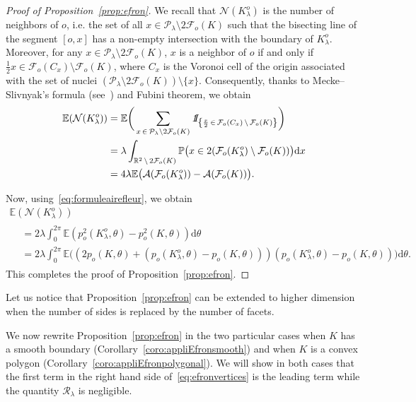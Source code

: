 \documentclass[AHL,Unicode,longabstracts,published]{cedram}
\newcommand{\indicat}{{\text{1}}\negthickspace\text{I}}
\newcommand{\cA}{\mathcal{A}}
\newcommand{\cF}{\mathcal{F}}
\newcommand{\cN}{\mathcal{N}}
\newcommand{\cP}{\mathcal{P}}
\newcommand{\cR}{\mathcal{R}}
\newcommand{\dd}{\mathrm{d}}
\newcommand{\E}{\mathbb{E}}
\renewcommand{\P}{\mathbb{P}}
\newcommand{\R}{\mathbb{R}}
\newcommand{\pass}{\vspace{0.3cm}\noindent}
\newcommand{\noi}{\noindent}
\newcommand{\R}{\mathbb{R}}
\begin{document}
\begin{proof}[{Proof of Proposition~\ref{prop:efron}}]
We recall that $\cN(K_{\lambda}^o)$ is the number of neighbors of $o$, i.e. the set of all $x\in\cP_{\lambda}\setminus 2\cF_o(K)$ such that the bisecting line of the segment $[o,x]$ has a non-empty intersection with the boundary of $K_{\lambda}^o$. Moreover, for any $x\in\cP_{\lambda}\setminus 2\cF_o(K)$, $x$ is a neighbor of $o$ if and only if $\tfrac{1}{2}x\in \cF_o(C_x)\setminus\cF_o(K)$, where $C_x$ is the Voronoi cell of the origin associated with the set of nuclei $(\cP_{\lambda}\setminus 2\cF_o(K))\setminus\{x\}$. Consequently, thanks to Mecke--Slivnyak's formula (see~\cite[Corollary~3.2.3]{SW}) and Fubini theorem, we obtain
\begin{align*}
\E(\cN(K_{\lambda}^o)) &= \E\bigg(\sum_{x\,\in\,\cP_{\lambda}\setminus2\cF_o(K)}{\emph{\indicat}}_{\left\{\frac{x}{2}\,\in\,\cF_o(C_x)\,\setminus\,\cF_o(K)\right\}}\bigg)\\
& = \lambda\int_{\R^2\,\setminus\,2\cF_o(K)}\P\big(x\in 2(\cF_o(K_{\lambda}^o)\setminus\cF_o(K))\big)\dd x \\
& = 4\lambda\E\big(\cA(\cF_o(K_{\lambda}^o))-\cA(\cF_o(K))\big).
\end{align*}

Now, using~\eqref{eq:formuleairefleur}, we obtain
\begin{multline*}\label{sophie}
\E(\cN(K_{\lambda}^o)) \\
\begin{aligned}
& = 2\lambda\int_0^{2\pi}\E\left(p_o^2\left(K_{\lambda}^o,\theta\right)-p_o^2(K,\theta)\right)\dd\theta\\
& = 2\lambda\int_0^{2\pi}\E\big((2p_o(K,\theta)+(p_o(K_{\lambda}^o,\theta)-p_o(K,\theta)))(p_o(K_{\lambda}^o,\theta)-p_o(K,\theta))\big)\dd\theta.
\end{aligned}
\end{multline*}
This completes the proof of Proposition~\ref{prop:efron}.
\end{proof}

Let us notice that Proposition~\ref{prop:efron} can be extended to higher dimension when the number of sides is replaced by the number of facets.


We now rewrite Proposition~\ref{prop:efron} in the two particular cases when $K$ has a smooth boundary (Corollary~\ref{coro:appliEfronsmooth}) and when $K$ is a convex polygon (Corollary~\ref{coro:appliEfronpolygonal}). We will show in both cases that the first term in the right hand side of~\eqref{eq:efronvertices} is the leading term while the quantity ${\cR}_\lambda$ is negligible.
\end{document}
